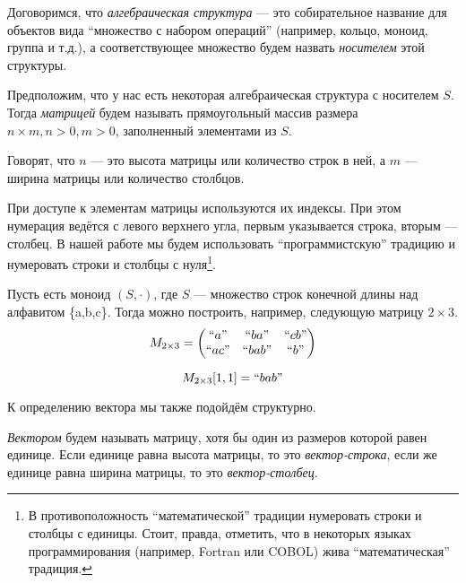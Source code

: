 Договоримся, что \textit{алгебраическая структура} --- это собирательное название для объектов вида ``множество с набором операций'' (например, кольцо, моноид, группа и т.д.), а соответствующее множество будем назвать \textit{носителем} этой структуры.

\begin{definition}

Предположим, что у нас есть некоторая алгебраическая структура с носителем $S$. Тогда \emph{матрицей} будем называть прямоугольный массив размера $n\times m, n > 0, m > 0$, заполненный элементами из $S$.

Говорят, что $n$ --- это высота матрицы или количество строк в ней, а $m$ --- ширина матрицы или количество столбцов.

\end{definition}

При доступе к элементам матрицы используются их индексы. При этом нумерация ведётся с левого верхнего угла, первым указывается строка, вторым --- столбец. В нашей работе мы будем использовать ``программистскую'' традицию и нумеровать строки и столбцы с нуля\footnote{В противоположность ``математической'' традиции нумеровать строки и столбцы с единицы. Стоит, правда, отметить, что в некоторых языках программирования (например, Fortran или COBOL) жива ``математическая'' традиция.}.

\begin{example}[Матрица]

Пусть есть моноид $(S,\cdot)$, где $S$ --- множество строк конечной длины над алфавитом \{a,b,c\}.
Тогда можно построить, например, следующую матрицу $2\times 3$.
$$
M_{2\times 3} =
\begin{pmatrix}
``a" & ``ba" & ``cb" \\
``ac" & ``bab" & ``b" \\
\end{pmatrix}
$$

$$
M_{2\times 3}[1,1] = ``bab"
$$

\end{example}

К определению вектора мы также подойдём структурно.

\begin{definition}

\emph{Вектором} будем называть матрицу, хотя бы один из размеров которой равен единице. Если единице равна высота матрицы, то это \textit{вектор-строка}, если же единице равна ширина матрицы, то это \textit{вектор-столбец}.

\end{definition}


